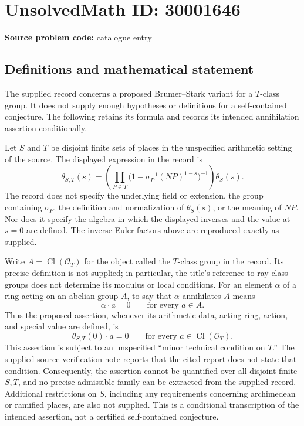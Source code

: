 \documentclass[11pt]{article}
\begin{document}
\section*{UnsolvedMath ID: 30001646}
\textbf{Source problem code:} catalogue entry
\subsection{Definitions and mathematical statement}
The supplied record concerns a proposed Brumer--Stark variant for a \(T\)-class group. It does not supply enough hypotheses or definitions for a self-contained conjecture. The following retains its formula and records its intended annihilation assertion conditionally.

Let \(S\) and \(T\) be disjoint finite sets of places in the unspecified arithmetic setting of the source. The displayed expression in the record is
\[
\theta_{S,T}(s)
=
\left(\prod_{P\in T}
\bigl(1-\sigma_P^{-1}(NP)^{1-s}\bigr)^{-1}\right)
\theta_S(s).
\]
The record does not specify the underlying field or extension, the group containing \(\sigma_P\), the definition and normalization of \(\theta_S(s)\), or the meaning of \(NP\). Nor does it specify the algebra in which the displayed inverses and the value at \(s=0\) are defined. The inverse Euler factors above are reproduced exactly as supplied.

Write \(A=\operatorname{Cl}(\mathcal O_T)\) for the object called the \(T\)-class group in the record. Its precise definition is not supplied; in particular, the title's reference to ray class groups does not determine its modulus or local conditions. For an element \(\alpha\) of a ring acting on an abelian group \(A\), to say that \(\alpha\) annihilates \(A\) means
\[
\alpha\cdot a=0\qquad\text{for every }a\in A.
\]
Thus the proposed assertion, whenever its arithmetic data, acting ring, action, and special value are defined, is
\[
\theta_{S,T}(0)\cdot a=0
\qquad\text{for every }a\in\operatorname{Cl}(\mathcal O_T).
\]
This assertion is subject to an unspecified ``minor technical condition on \(T\).'' The supplied source-verification note reports that the cited report does not state that condition. Consequently, the assertion cannot be quantified over all disjoint finite \(S,T\), and no precise admissible family can be extracted from the supplied record. Additional restrictions on \(S\), including any requirements concerning archimedean or ramified places, are also not supplied. This is a conditional transcription of the intended assertion, not a certified self-contained conjecture.
\end{document}
